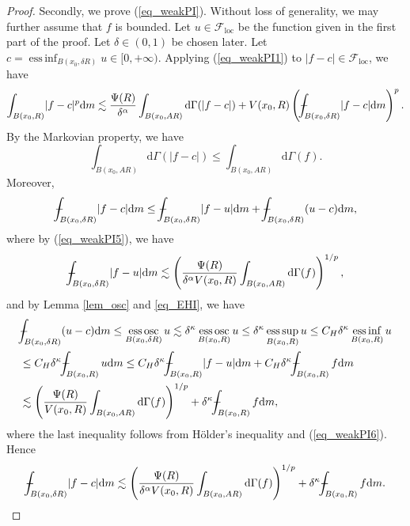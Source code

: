 \documentclass[11pt,a4paper]{article}
\numberwithin{equation}{section}
\newcommand{\esup}{\operatorname*{ess\,sup}}
\newcommand{\einf}{\operatorname*{ess\,inf}}
\newcommand{\eosc}{\operatorname*{ess\,osc}}
\def\Xint#1{\mathchoice
{\XXint\displaystyle\textstyle{#1}}%
{\XXint\textstyle\scriptstyle{#1}}%
{\XXint\scriptstyle\scriptscriptstyle{#1}}%
{\XXint\scriptscriptstyle\scriptscriptstyle{#1}}%
\!\int}
\def\XXint#1#2#3{{\setbox0=\hbox{$#1{#2#3}{\int}$ }
\vcenter{\hbox{$#2#3$ }}\kern-.6\wd0}}
\def\dashint{\Xint-}
\theoremstyle{plain}
\theoremstyle{definition}
\begin{document}
\begin{proof}
Secondly, we prove (\ref{eq_weakPI}). Without loss of generality, we may further assume that $f$ is bounded. Let $u\in \mathcal{F}_{\mathrm{loc}}$ be the function given in the first part of the proof. Let $\delta\in(0,1)$ be chosen later. Let $c=\einf_{B(x_0,\delta R)}u\in[0,+\infty)$. Applying (\ref{eq_weakPI1}) to $\lvert f-c\rvert\in \mathcal{F}_{\mathrm{loc}}$, we have
\begin{equation}\label{eq_weakPI7}
\int_{B(x_0,R)}\lvert f-c\rvert^p \mathrm{d}m\lesssim \frac{\Psi(R)}{\delta^\alpha}\int_{B(x_0,AR)}\mathrm{d}\Gamma(\lvert f-c\rvert)+V(x_0,R)\left(\dashint_{B(x_0,\delta R)}\lvert f-c\rvert \mathrm{d}m\right)^p.
\end{equation}
By the Markovian property, we have
\begin{equation}\label{eq_weakPI8}
\int_{B(x_0,AR)}\mathrm{d}\Gamma(\lvert f-c\rvert)\le \int_{B(x_0,AR)}\mathrm{d}\Gamma(f).
\end{equation}
Moreover,
\begin{equation*}
\dashint_{B(x_0,\delta R)}\lvert f-c\rvert \mathrm{d}m\le \dashint_{B(x_0,\delta R)}\lvert f-u\rvert \mathrm{d}m+\dashint_{B(x_0,\delta R)}(u-c)\mathrm{d}m,
\end{equation*}
where by (\ref{eq_weakPI5}), we have
\begin{equation*}
\dashint_{B(x_0,\delta R)}\lvert f-u\rvert \mathrm{d}m\lesssim \left(\frac{\Psi(R)}{\delta^{\alpha}V(x_0,R)}\int_{B(x_0,AR)}\mathrm{d}\Gamma(f)\right)^{1/p},
\end{equation*}
and by Lemma \ref{lem_osc} and \ref{eq_EHI}, we have
\begin{align*}
&\dashint_{B(x_0,\delta R)}(u-c)\mathrm{d}m\le \eosc_{B(x_0,\delta R)}u\lesssim \delta^\kappa \eosc_{B(x_0,R)}u\le\delta^\kappa \esup_{B(x_0,R)}u\le C_H \delta^\kappa \einf_{B(x_0,R)}u\\
&\le C_H\delta^\kappa\dashint_{B(x_0,R)}u \mathrm{d}m\le C_H\delta^\kappa \dashint_{B(x_0,R)}\lvert f-u\rvert \mathrm{d}m+C_H\delta^\kappa \dashint_{B(x_0,R)}f \mathrm{d}m\\
&\lesssim  \left(\frac{\Psi(R)}{V(x_0,R)}\int_{B(x_0,AR)}\mathrm{d}\Gamma(f)\right)^{1/p}+\delta^\kappa\dashint_{B(x_0,R)}f \mathrm{d}m,
\end{align*}
where the last inequality follows from H\"older's inequality and (\ref{eq_weakPI6}). Hence
\begin{align*}
\dashint_{B(x_0,\delta R)}\lvert f-c\rvert \mathrm{d}m\lesssim\left(\frac{\Psi(R)}{\delta^{\alpha}V(x_0,R)}\int_{B(x_0,AR)}\mathrm{d}\Gamma(f)\right)^{1/p}+\delta^\kappa\dashint_{B(x_0,R)}f \mathrm{d}m.

\end{align*}
\end{proof}
\end{document}
